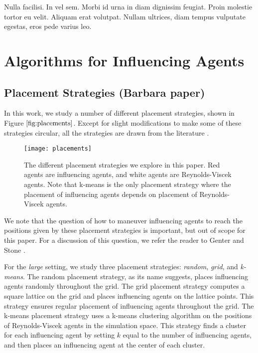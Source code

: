 \begin{savequote}[75mm]
Nulla facilisi. In vel sem. Morbi id urna in diam dignissim feugiat. Proin molestie tortor eu velit. Aliquam erat volutpat. Nullam ultrices, diam tempus vulputate egestas, eros pede varius leo.
\end{savequote}

\chapter{Algorithms for Influencing Agents}
\label{ch:influencing}

\section{Placement Strategies (Barbara paper)}
In this work, we study a number of different placement strategies, shown in
Figure $\ref{fig:placements}$.
Except for slight modifications to make some of these strategies circular, all
the strategies are drawn from the literature \cite{genter2015placement,
genterthesis}.
\begin{figure}
    \centering
    \texttt{[image: placements]}
    \caption{The different placement strategies we explore in this paper.
    Red agents are influencing agents, and white agents are Reynolds-Viscek
    agents.
    Note that k-means is the only placement strategy where the placement of
    influencing agents depends on placement of Reynolds-Viscek agents.}
    \label{fig:placements}
\end{figure}
We note that the question of how to maneuver influencing agents to reach the
positions given by these placement strategies is important, but out of scope
for this paper.
For a discussion of this question, we refer the reader to Genter and Stone
\cite{genter2016facegoalfacecurrent, genterthesis}.

For the \textit{large} setting, we study three placement strategies:
\textit{random}, \textit{grid}, and \textit{k-means}.
The random placement strategy, as its name suggests, places influencing agents
randomly throughout the grid.
The grid placement strategy computes a square lattice on the grid and places
influencing agents on the lattice points.
This strategy ensures regular placement of influencing agents throughout the
grid.
The k-means placement strategy uses a k-means clustering algorithm on the
positions of Reynolds-Viscek agents in the simulation space.
This strategy finds a cluster for each influencing agent by setting $k$ equal
to the number of influencing agents, and then places an influencing agent at
the center of each cluster.

